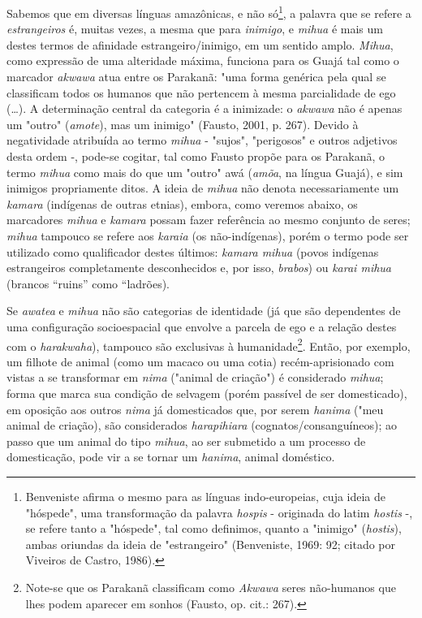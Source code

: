 Sabemos que em diversas línguas amazônicas, e não só\footnote{Benveniste
  afirma o mesmo para as línguas indo-europeias, cuja ideia de
  "hóspede", uma transformação da palavra \emph{hospis} - originada do
  latim \emph{hostis} -, se refere tanto a "hóspede", tal como
  definimos, quanto a "inimigo" (\emph{hostis}), ambas oriundas da ideia
  de "estrangeiro" (Benveniste, 1969: 92; citado por Viveiros de Castro,
  1986).}, a palavra que se refere a \emph{estrangeiros} é, muitas
vezes, a mesma que para \emph{inimigo}, e \emph{mihua} é mais um destes
termos de afinidade estrangeiro/inimigo, em um sentido amplo.
\emph{Mihua}, como expressão de uma alteridade máxima, funciona para os
Guajá tal como o marcador \emph{akwawa} atua entre os Parakanã: "uma
forma genérica pela qual se classificam todos os humanos que não
pertencem à mesma parcialidade de ego (\ldots{}). A determinação central da
categoria é a inimizade: o \emph{akwawa} não é apenas um "outro"
(\emph{amote}), mas um inimigo" (Fausto, 2001, p. 267). Devido à
negatividade atribuída ao termo \emph{mihua} - "sujos", "perigosos" e
outros adjetivos desta ordem -, pode-se cogitar, tal como Fausto propõe
para os Parakanã, o termo \emph{mihua} como mais do que um "outro" awá
(\emph{amõa}, na língua Guajá), e sim inimigos propriamente ditos. A
ideia de \emph{mihua} não denota necessariamente um \emph{kamara}
(indígenas de outras etnias), embora, como veremos abaixo, os marcadores
\emph{mihua} e \emph{kamara} possam fazer referência ao mesmo conjunto
de seres; \emph{mihua} tampouco se refere aos \emph{karaia} (os
não-indígenas), porém o termo pode ser utilizado como qualificador
destes últimos: \emph{kamara mihua} (povos indígenas estrangeiros
completamente desconhecidos e, por isso, \emph{brabos}) ou \emph{karai
mihua} (brancos ``ruins'' como ``ladrões).

Se \emph{awatea} e \emph{mihua} não são categorias de identidade (já que
são dependentes de uma configuração socioespacial que envolve a parcela
de ego e a relação destes com o \emph{harakwaha}), tampouco são
exclusivas à humanidade\footnote{Note-se que os Parakanã classificam
  como \emph{Akwawa} seres {não-humanos} que lhes podem aparecer em
  sonhos (Fausto, op. cit.: 267).}. Então, por exemplo, um filhote de
animal (como um macaco ou uma cotia) recém-aprisionado com vistas a se
transformar em \emph{nima} ("animal de criação") é considerado
\emph{mihua}; forma que marca sua condição de selvagem (porém passível
de ser domesticado), em oposição aos outros \emph{nima} já domesticados
que, por serem \emph{hanima} ("meu animal de criação), são considerados
\emph{harapihiara} (cognatos/consanguíneos); ao passo que um animal do
tipo \emph{mihua}, ao ser submetido a um processo de domesticação, pode
vir a se tornar um \emph{hanima}, animal doméstico.

